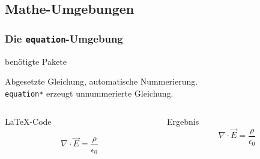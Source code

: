 \subsection{Mathe-Umgebungen}
\begin{frame}[fragile]
    \frametitle{Die \texttt{equation}-Umgebung
        \hfill{}
    }
   \begin{block}{benötigte Pakete}
    \begin{lstverbatim}
        \usepackage{amsmath}
        \usepackage{amssymb}
        \usepackage{mathtools}
    \end{lstverbatim}
   \end{block}
    Abgesetzte Gleichung, automatische Nummerierung. \\
    \texttt{equation*} erzeugt unnummerierte Gleichung.
    \begin{columns}[T]
        \begin{column}{0.6\textwidth}
            \begin{block}{\LaTeX-Code}
                \begin{lstverbatim}
                \begin{equation}
                    \nabla \cdot \vec{E} =
                    \frac{\rho} {\epsilon_0}
                    \label{eq:maxwell1}
                \end{equation}
                \end{lstverbatim}
            \end{block}
        \end{column}
        \begin{column}{0.35\textwidth}
            \begin{block}{Ergebnis}
                \begin{equation}
                    \nabla \cdot \vec{E} =
                    \frac{\rho}{\epsilon_0}
                    \label{eq:maxwell1}
                \end{equation}
            \end{block}
        \end{column}
    \end{columns}
\end{frame}
